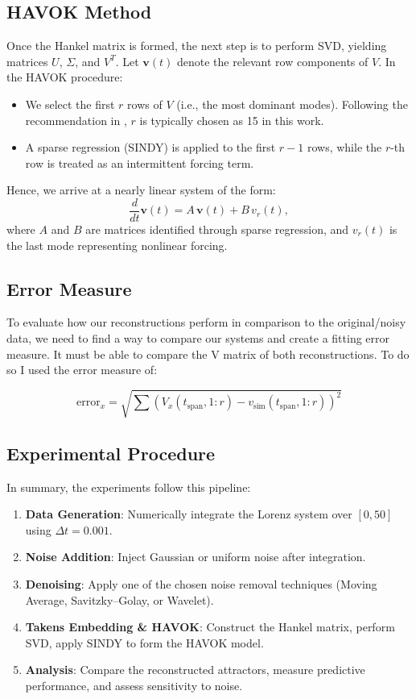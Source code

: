 \documentclass[11pt]{article}
\begin{document}
	\subsection{HAVOK Method}
	Once the Hankel matrix is formed, the next step is to perform SVD, yielding matrices \(U\), \(\Sigma\), and \(V^T\). Let \(\mathbf{v}(t)\) denote the relevant row components of \(V\). In the HAVOK procedure:
	\begin{itemize}
		\item We select the first \(r\) rows of \(V\) (i.e., the most dominant modes). Following the recommendation in \citep{brunton2017}, \(r\) is typically chosen as 15 in this work.
		\item A sparse regression (SINDY) is applied to the first \(r-1\) rows, while the \(r\)-th row is treated as an intermittent forcing term.
	\end{itemize}
	Hence, we arrive at a nearly linear system of the form:
	\begin{equation}
		\frac{d}{dt}\mathbf{v}(t) = A\,\mathbf{v}(t) + B\,v_r(t),
		\label{eq:havok}
	\end{equation}
	where \(A\) and \(B\) are matrices identified through sparse regression, and \(v_r(t)\) is the last mode representing nonlinear forcing.
	
	\subsection{Error Measure}
	To evaluate how our reconstructions perform in comparison to the original/noisy data, we need to find a way to compare our systems and create a fitting error measure. It must be able to compare the V matrix of both reconstructions. To do so I used the error measure of:
	
	\begin{equation}
		\text{error}_x = \sqrt{\sum \left( V_x(t_{\text{span}},1:r) - v_{\text{sim}}(t_{\text{span}},1:r) \right)^2 }
	\end{equation}
	 
	
	\subsection{Experimental Procedure}
	In summary, the experiments follow this pipeline:
	\begin{enumerate}
		\item \textbf{Data Generation}: Numerically integrate the Lorenz system over \([0,50]\) using \(\Delta t = 0.001\).
		\item \textbf{Noise Addition}: Inject Gaussian or uniform noise after integration.
		\item \textbf{Denoising}: Apply one of the chosen noise removal techniques (Moving Average, Savitzky--Golay, or Wavelet).
		\item \textbf{Takens Embedding \& HAVOK}: Construct the Hankel matrix, perform SVD, apply SINDY to form the HAVOK model.
		\item \textbf{Analysis}: Compare the reconstructed attractors, measure predictive performance, and assess sensitivity to noise.
	\end{enumerate}
	
\end{document}
